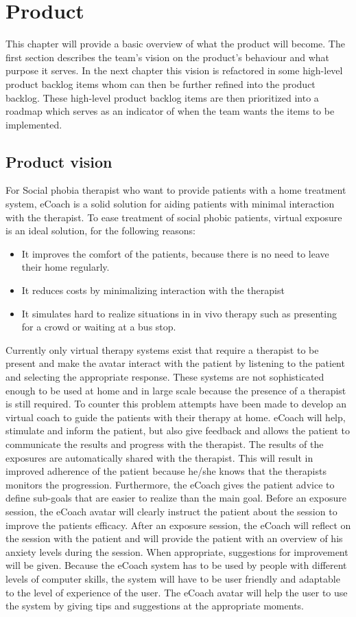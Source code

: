 \chapter{Product}
This chapter will provide a basic overview of what the product will become. The first section describes the team's vision on the product's behaviour and what purpose it serves. In the next chapter this vision is refactored in some high-level product backlog items whom can then be further refined into the product backlog. These high-level product backlog items are then prioritized into a roadmap which serves as an indicator of when the team wants the items to be implemented.

\section{Product vision}
For Social phobia therapist who want to provide patients with a home treatment system, \gls{eCoach} is a  solid solution for aiding patients with minimal interaction with the therapist. To ease treatment of social phobic patients, virtual exposure is an ideal solution, for the following reasons:
\begin{itemize}
\item It improves the comfort of the patients, because there is no need to leave their home regularly.
\item It reduces costs by minimalizing interaction with the therapist
\item It simulates hard to realize situations in in vivo therapy such as presenting for a crowd or waiting at a bus stop.
\end{itemize}
Currently only virtual therapy systems exist that require a therapist to be present and make the \gls{avatar} interact with the patient by listening to the patient and selecting the appropriate response. These systems are not sophisticated enough to be used at home and in large scale because the presence of a therapist is still required. To counter this problem attempts have been made to develop an virtual coach to guide the patients with their therapy at home.
\gls{eCoach} will help, stimulate and inform the patient, but also give feedback and allows the patient to communicate the results and progress with the therapist. The results of the exposures are automatically shared with the therapist. This will result in improved adherence of the patient because he/she knows that the therapists monitors the progression.
Furthermore, the \gls{eCoach} gives the patient advice to define sub-goals that are easier to realize than the main goal. Before an exposure session, the \gls{eCoach} \gls{avatar} will clearly instruct the patient about the session to improve the patients efficacy. After an exposure session, the \gls{eCoach} will reflect on the session with the patient and will provide the patient with an overview of his anxiety levels during the session. When appropriate, suggestions for improvement will be given.
Because the \gls{eCoach} system has to be used by people with different levels of computer skills, the system will have to be user friendly and adaptable to the level of experience of the user. The \gls{eCoach} \gls{avatar} will help the user to use the system by giving tips and suggestions at the appropriate moments.


